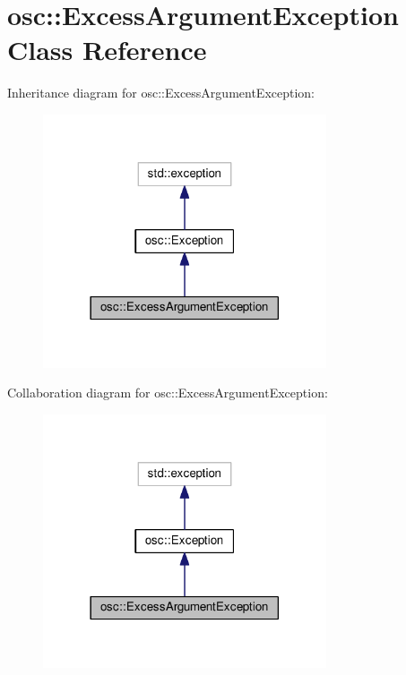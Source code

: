 \hypertarget{classosc_1_1_excess_argument_exception}{}\section{osc\+:\+:Excess\+Argument\+Exception Class Reference}
\label{classosc_1_1_excess_argument_exception}


Inheritance diagram for osc\+:\+:Excess\+Argument\+Exception\+:\nopagebreak
\begin{figure}[H]
\begin{center}
\leavevmode
\includegraphics[width=237pt]{classosc_1_1_excess_argument_exception__inherit__graph}
\end{center}
\end{figure}


Collaboration diagram for osc\+:\+:Excess\+Argument\+Exception\+:\nopagebreak
\begin{figure}[H]
\begin{center}
\leavevmode
\includegraphics[width=237pt]{classosc_1_1_excess_argument_exception__coll__graph}
\end{center}
\end{figure}
